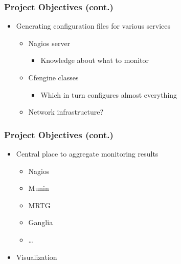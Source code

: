 \documentclass{beamer}
\begin{document}
\begin{frame}
\frametitle{Project Objectives (cont.)}

\begin{itemize}
    \item Generating configuration files for various services
        \begin{itemize}
            \item Nagios server
                \begin{itemize}
                    \item Knowledge about what to monitor
                \end{itemize}
            \item Cfengine classes
                \begin{itemize}
                    \item Which in turn configures almost everything
                \end{itemize}
            \item Network infrastructure?
        \end{itemize}
\end{itemize}
\end{frame}

\begin{frame}
\frametitle{Project Objectives (cont.)}
    \begin{itemize}
    \item Central place to aggregate monitoring results
        \begin{itemize}
            \item Nagios
            \item Munin
            \item MRTG
            \item Ganglia
            \item \ldots
        \end{itemize}
    \item Visualization
\end{itemize}

\end{frame}
\end{document}
